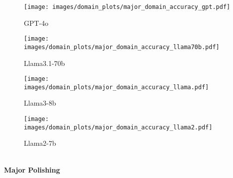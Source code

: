 \begin{figure*}[htbp]
    \vspace{0.5cm} %
    \begin{minipage}{\textwidth}
    \centering
        \begin{subfigure}{0.24\textwidth}
            \centering
            \texttt{[image: images/domain\_plots/major\_domain\_accuracy\_gpt.pdf]}
            \caption{GPT-4o}
        \end{subfigure}
        \hfill
        \begin{subfigure}{0.24\textwidth}
            \centering
            \texttt{[image: images/domain\_plots/major\_domain\_accuracy\_llama70b.pdf]}
            \caption{Llama3.1-70b}
        \end{subfigure}
        \hfill
        \begin{subfigure}{0.24\textwidth}
            \centering
            \texttt{[image: images/domain\_plots/major\_domain\_accuracy\_llama.pdf]}
            \caption{Llama3-8b}
        \end{subfigure}
        \hfill
        \begin{subfigure}{0.24\textwidth}
            \centering
            \texttt{[image: images/domain\_plots/major\_domain\_accuracy\_llama2.pdf]}
            \caption{Llama2-7b}
        \end{subfigure}
        \\ %
        \vspace{0.2cm}
        \small \textbf{Major Polishing}
    \end{minipage}



\end{figure*}
